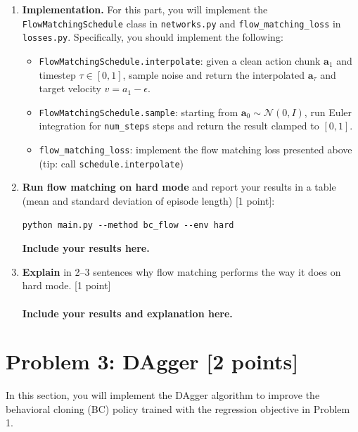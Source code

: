 \documentclass[12pt]{article}
\begin{document}
\begin{enumerate}

\item \textbf{Implementation.} For this part, you will implement the \texttt{FlowMatchingSchedule} class in \texttt{networks.py} and \texttt{flow\_matching\_loss} in \texttt{losses.py}. Specifically, you should implement the following:

\begin{itemize}
    \item \texttt{FlowMatchingSchedule.interpolate}: given a clean action chunk $\textbf{a}_1$ and timestep $\tau \in [0,1]$, sample noise and return the interpolated $\textbf{a}_\tau$ and target velocity $v = a_1 - \epsilon$.
    \item \texttt{FlowMatchingSchedule.sample}: starting from $\textbf{a}_0 \sim \mathcal{N}(0, I)$, run Euler integration for \texttt{num\_steps} steps and return the result clamped to $[0,1]$.
    \item \texttt{flow\_matching\_loss}: implement the flow matching loss presented above (tip: call \texttt{schedule.interpolate})
\end{itemize}

\item \textbf{Run flow matching on hard mode} and report your results in a table (mean and standard deviation of episode length) [1 point]:

\begin{tcolorbox}[width=\linewidth, sharp corners=all, colback=white!95!black]
\begin{verbatim}
python main.py --method bc_flow --env hard
\end{verbatim}
\end{tcolorbox}

\textbf{\color{red}Include your results here.}

\item \textbf{Explain} in 2--3 sentences why flow matching performs the way it does on hard mode. [1 point]\\
\\
\textbf{\color{red}Include your results and explanation here.}

\end{enumerate}

\section*{Problem 3: DAgger [2 points]}

In this section, you will implement the DAgger algorithm to improve the behavioral cloning (BC) policy trained with the regression objective in Problem 1.
\end{document}
